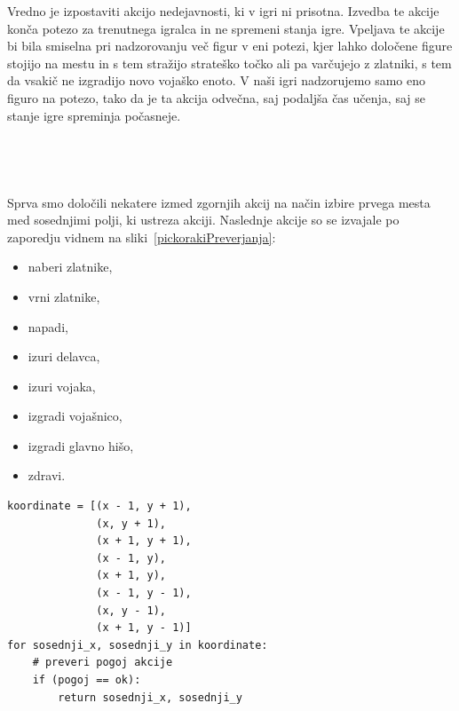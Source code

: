 \documentclass[a4paper, 12pt]{book}
\begin{document}
{Vredno je izpostaviti akcijo nedejavnosti, ki v igri ni prisotna.
Izvedba te akcije konča potezo za trenutnega igralca in ne spremeni stanja igre.
Vpeljava te akcije bi bila smiselna pri nadzorovanju več figur v eni potezi, kjer lahko določene figure stojijo na mestu in s tem stražijo strateško točko ali pa varčujejo z zlatniki, s tem da vsakič ne izgradijo novo vojaško enoto.
V naši igri nadzorujemo samo eno figuro na potezo, tako da je ta akcija odvečna, saj podaljša čas učenja, saj se stanje igre spreminja počasneje.\\\\\\\\\\

Sprva smo določili nekatere izmed zgornjih akcij na način izbire prvega mesta med sosednjimi polji, ki ustreza akciji. 
Naslednje akcije so se izvajale po zaporedju vidnem na sliki~\ref{pickorakiPreverjanja}:
\begin{itemize}
	\item naberi zlatnike,
	\item vrni zlatnike,
	\item napadi,
	\item izuri delavca,
	\item izuri vojaka, 
	\item izgradi vojašnico,
	\item izgradi glavno hišo,
	\item zdravi.
\end{itemize}
\begin{verbatim}
koordinate = [(x - 1, y + 1),
              (x, y + 1),
              (x + 1, y + 1),
              (x - 1, y),
              (x + 1, y),
              (x - 1, y - 1),
              (x, y - 1),
              (x + 1, y - 1)]
for sosednji_x, sosednji_y in koordinate:
    # preveri pogoj akcije
    if (pogoj == ok):
        return sosednji_x, sosednji_y
\end{verbatim}

}
\end{document}
